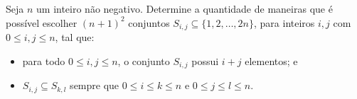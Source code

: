 Seja $n$ um inteiro não negativo. Determine a quantidade de maneiras que é possível escolher $(n+1)^2$ conjuntos $S_{i,j}\subseteq\{1,2,\ldots,2n\}$, para inteiros $i,j$ com $0\leq i,j\leq n$, tal que:
\begin{itemize}
	\item para todo $0\leq i,j\leq n$, o conjunto $S_{i,j}$ possui $i+j$ elementos; e
	\item $S_{i,j}\subseteq S_{k,l}$ sempre que $0\leq i\leq k\leq n$ e $0\leq j\leq l\leq n$.
\end{itemize}
